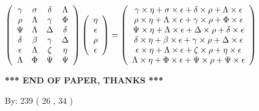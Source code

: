 \documentclass[12pt]{article}
\begin{document}
$  %
 \left( \begin{array}
 {
 c
 c
 c
 c
 }
 \gamma & 
 \sigma & 
 \delta & 
 \Lambda \\ 
 \rho & 
 \Lambda & 
 \gamma & 
 \Phi \\ 
 \Psi & 
 \Lambda & 
 \Delta & 
 \delta \\ 
 \delta & 
 \beta & 
 \gamma & 
 \Delta \\ 
 \epsilon & 
 \Lambda & 
                    \zeta & 
 \eta \\ 
 \Lambda & 
 \Phi & 
 \Psi & 
 \Psi
 \end{array} \right)
 \left( \begin{array}
 {
 c
 }
 \eta \\ 
 \epsilon \\ 
 \rho \\ 
 \epsilon
 \end{array} \right)
=
 \left( \begin{array}
 {
 c
 }
  \gamma \times  \eta +  \sigma \times  \epsilon +  \delta \times  \rho +  \Lambda \times  \epsilon \\ 
  \rho \times  \eta +  \Lambda \times  \epsilon +  \gamma \times  \rho +  \Phi \times  \epsilon \\ 
  \Psi \times  \eta +  \Lambda \times  \epsilon +  \Delta \times  \rho +  \delta \times  \epsilon \\ 
  \delta \times  \eta +  \beta \times  \epsilon +  \gamma \times  \rho +  \Delta \times  \epsilon \\ 
  \epsilon \times  \eta +  \Lambda \times  \epsilon +                     \zeta \times  \rho +  \eta \times  \epsilon \\ 
  \Lambda \times  \eta +  \Phi \times  \epsilon +  \Psi \times  \rho +  \Psi \times  \epsilon
 \end{array} \right)
$
 
 
 
 
 
\noindent{}

 
 
   
   
 \vspace{0.2in}
 
   
   
   
   
\vspace{1.0in} 
{\textbf{\large{ *** END OF PAPER, THANKS *** }}} 
   
   
\hspace{1.0in} By: 
         239 (          26 ,           34 )
   
\end{document}
